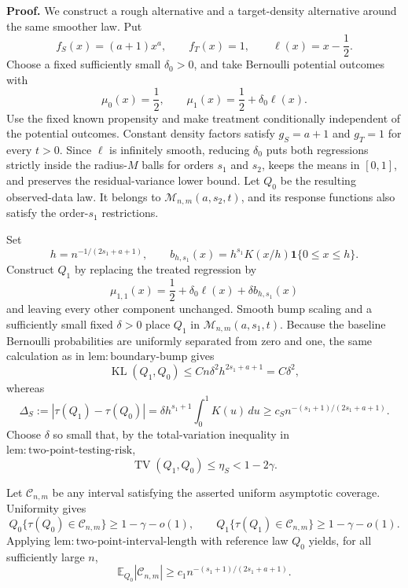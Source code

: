 \textbf{Proof.}
We construct a rough alternative and a target-density alternative around the same smoother law. Put
\[
f_S(x)=(a+1)x^a,
\qquad
f_T(x)=1,
\qquad
\ell(x)=x-\frac12.
\]
Choose a fixed sufficiently small \(\delta_0>0\), and take Bernoulli potential outcomes with
\[
\mu_0(x)=\frac12,
\qquad
\mu_1(x)=\frac12+\delta_0\ell(x).
\]
Use the fixed known propensity and make treatment conditionally independent of the potential outcomes. Constant density factors satisfy \(g_S=a+1\) and \(g_T=1\) for every \(t>0\). Since \(\ell\) is infinitely smooth, reducing \(\delta_0\) puts both regressions strictly inside the radius-\(M\) balls for orders \(s_1\) and \(s_2\), keeps the means in \([0,1]\), and preserves the residual-variance lower bound. Let \(Q_0\) be the resulting observed-data law. It belongs to \(\mathcal M_{n,m}(a,s_2,t)\), and its response functions also satisfy the order-\(s_1\) restrictions.

Set
\[
h=n^{-1/(2s_1+a+1)},
\qquad
b_{h,s_1}(x)=h^{s_1}K(x/h)\mathbf 1\{0\le x\le h\}.
\]
Construct \(Q_1\) by replacing the treated regression by
\[
\mu_{1,1}(x)=\frac12+\delta_0\ell(x)+\delta b_{h,s_1}(x)
\]
and leaving every other component unchanged. Smooth bump scaling and a sufficiently small fixed \(\delta>0\) place \(Q_1\) in \(\mathcal M_{n,m}(a,s_1,t)\). Because the baseline Bernoulli probabilities are uniformly separated from zero and one, the same calculation as in \(\mathrm{lem:boundary\text{-}bump}\) gives
\[
\operatorname{KL}(Q_1,Q_0)
\le Cn\delta^2h^{2s_1+a+1}
=C\delta^2,
\]
whereas
\[
\Delta_S:=|\tau(Q_1)-\tau(Q_0)|
=\delta h^{s_1+1}\int_0^1K(u)\,du
\ge c_Sn^{-(s_1+1)/(2s_1+a+1)}.
\]
Choose \(\delta\) so small that, by the total-variation inequality in \(\mathrm{lem:two\text{-}point\text{-}testing\text{-}risk}\),
\[
\operatorname{TV}(Q_1,Q_0)\le\eta_S<1-2\gamma.
\]

Let \(\mathcal C_{n,m}\) be any interval satisfying the asserted uniform asymptotic coverage. Uniformity gives
\[
Q_0\{\tau(Q_0)\in\mathcal C_{n,m}\}\ge1-\gamma-o(1),
\qquad
Q_1\{\tau(Q_1)\in\mathcal C_{n,m}\}\ge1-\gamma-o(1).
\]
Applying \(\mathrm{lem:two\text{-}point\text{-}interval\text{-}length}\) with reference law \(Q_0\) yields, for all sufficiently large \(n\),
\[
\mathbb E_{Q_0}|\mathcal C_{n,m}|
\ge c_1n^{-(s_1+1)/(2s_1+a+1)}.
\]

